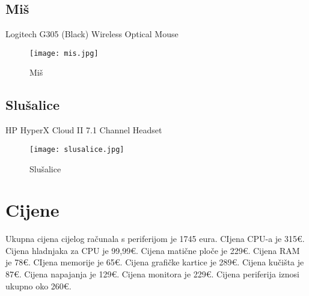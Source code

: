 \documentclass{report}
\begin{document}
\section{Miš}
Logitech G305 (Black) Wireless Optical Mouse
\begin{figure}[h]
    \texttt{[image: mis.jpg]}
    \caption{Miš}
\end{figure}

\section{Slušalice}
HP HyperX Cloud II 7.1 Channel Headset
\begin{figure}[h]
    \texttt{[image: slusalice.jpg]}
    \caption{Slušalice}
\end{figure}

\chapter{Cijene}
Ukupna cijena cijelog računala s periferijom je 1745 eura.
CIjena CPU-a je 315€.
Cijena hladnjaka za CPU je 99,99€.
Cijena matične ploče je 229€.
Cijena RAM je 78€.
CIjena memorije je 65€.
Cijena grafičke kartice je 289€.
Cijena kučišta je 87€.
Cijena napajanja je 129€.
Cijena monitora je 229€.
Cijena periferija iznosi ukupno oko 260€.
\end{document}
